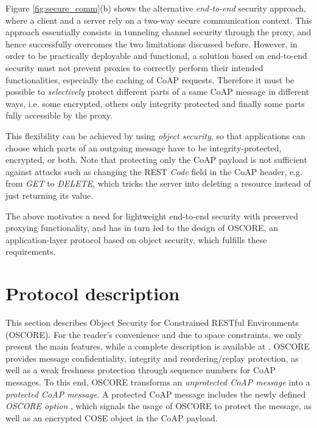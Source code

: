 {Figure \ref{fig:secure_comm}(b) shows the alternative \emph{end-to-end} security approach, where a client and a server rely on a two-way secure communication context. This approach essentially consists in tunneling channel security through the proxy, and hence successfully overcomes the two limitations discussed before. However, in order to be practically deployable and functional, a solution based on end-to-end security must not prevent proxies to correctly perform their intended functionalities, especially the caching of CoAP requests. Therefore it must be possible to \emph{selectively} protect different parts of a same CoAP message in different ways, i.e. some encrypted, others only integrity protected and finally some parts fully accessible by the proxy.

This flexibility can be achieved by using \emph{object security}, so that applications can choose which parts of an outgoing message have to be integrity-protected, encrypted, or both. Note that protecting only the CoAP payload is not sufficient against attacks such as changing the REST \emph{Code} field in the CoAP header, e.g. from \emph{GET} to \emph{DELETE}, which tricks the server into deleting a resource instead of just returning its value. 

The above motivates a need for lightweight end-to-end security with preserved proxying functionality, and has in turn led to the design of OSCORE, an application-layer protocol based on object security, which fulfills these requirements.


\section{Protocol description}
\label{sec:protocol}


\label{sec:oscoap}
This section describes Object Security for Constrained RESTful Environments (OSCORE). For the reader's convenience and due to space constraints, we only present the main features, while a complete description is available at \cite{cite:oscoap}.  OSCORE provides message confidentiality, integrity and reordering/replay protection, as well as a weak freshness protection through sequence numbers for CoAP messages. To this end, OSCORE transforms an \textit{unprotected CoAP message} into a \textit{protected CoAP message}. A protected CoAP message includes the newly defined \emph{OSCORE option} \cite{cite:oscoap}, which signals the usage of OSCORE to protect the message, as well as an encrypted COSE object \cite{rfc8152} in the CoAP payload. 

}
